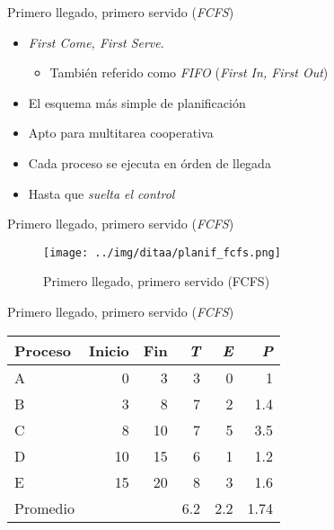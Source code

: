 \documentclass[presentation]{beamer}
\begin{document}
\begin{frame}[label={sec:org245e106}]{Primero llegado, primero servido (\emph{FCFS})}
\begin{itemize}
\item \emph{First Come, First Serve}.
\begin{itemize}
\item También referido como \emph{FIFO} (\emph{First In, First Out})
\end{itemize}
\item El esquema más simple de planificación
\item Apto para multitarea cooperativa
\item Cada proceso se ejecuta en órden de llegada
\item Hasta que \emph{suelta el control}
\end{itemize}
\end{frame}
\begin{frame}[label={sec:org70c4a8d}]{Primero llegado, primero servido (\emph{FCFS})}
\begin{figure}[htbp]
\centering
\texttt{[image: ../img/ditaa/planif\_fcfs.png]}
\caption{Primero llegado, primero servido (FCFS)}
\end{figure}
\end{frame}

\begin{frame}[label={sec:orgdf4fd7b}]{Primero llegado, primero servido (\emph{FCFS})}
\begin{center}
\begin{tabular}{lrrrrr}
Proceso & Inicio & Fin & \emph{T} & \emph{E} & \emph{P}\\
\hline
A & 0 & 3 & 3 & 0 & 1\\
B & 3 & 8 & 7 & 2 & 1.4\\
C & 8 & 10 & 7 & 5 & 3.5\\
D & 10 & 15 & 6 & 1 & 1.2\\
E & 15 & 20 & 8 & 3 & 1.6\\
\hline
Promedio &  &  & 6.2 & 2.2 & 1.74\\
\end{tabular}
\end{center}
\end{frame}
\end{document}
